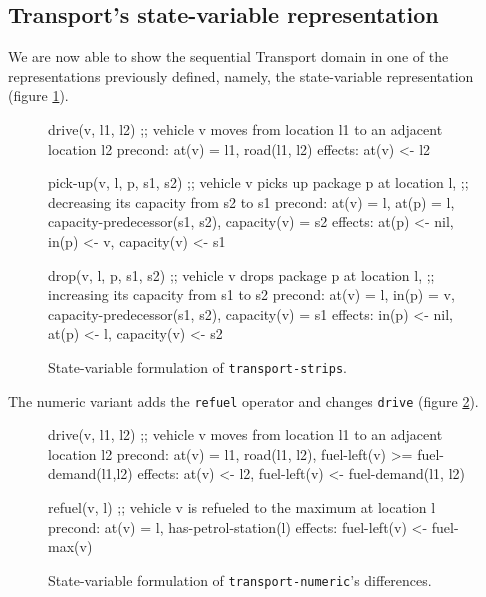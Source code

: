 
\subsection{Transport's state-variable representation}

We are now able to show the sequential Transport domain
in one of the representations previously defined, namely,
the state-variable representation (figure \ref{code:statevar-strips}).



\begin{figure}[htb]
\begin{code}
drive(v, l1, l2)
  ;; vehicle v moves from location l1 to an adjacent location l2
  precond: at(v) = l1, road(l1, l2)
  effects: at(v) <- l2

pick-up(v, l, p, s1, s2)
  ;; vehicle v picks up package p at location l,
  ;; decreasing its capacity from s2 to s1
  precond: at(v) = l, at(p) = l, capacity-predecessor(s1, s2),
           capacity(v) = s2
  effects: at(p) <- nil, in(p) <- v, capacity(v) <- s1
  
drop(v, l, p, s1, s2)
  ;; vehicle v drops package p at location l,
  ;; increasing its capacity from s1 to s2
  precond: at(v) = l, in(p) = v, capacity-predecessor(s1, s2),
           capacity(v) = s1
  effects: in(p) <- nil, at(p) <- l, capacity(v) <- s2
\end{code}
\caption{State-variable formulation of \texttt{transport-strips}.}
\label{code:statevar-strips}
\end{figure}

The numeric variant adds the \verb+refuel+ operator and changes \verb+drive+ (figure \ref{code:statevar-numeric}).

\begin{figure}[htb]
\begin{code}
drive(v, l1, l2)
  ;; vehicle v moves from location l1 to an adjacent location l2
  precond: at(v) = l1, road(l1, l2), fuel-left(v) >= fuel-demand(l1,l2)
  effects: at(v) <- l2, fuel-left(v) <-  fuel-demand(l1, l2)
  
refuel(v, l)
  ;; vehicle v is refueled to the maximum at location l
  precond: at(v) = l, has-petrol-station(l)
  effects: fuel-left(v) <- fuel-max(v)
\end{code}
\caption{State-variable formulation of \texttt{transport-numeric}'s differences.}
\label{code:statevar-numeric}
\end{figure}

